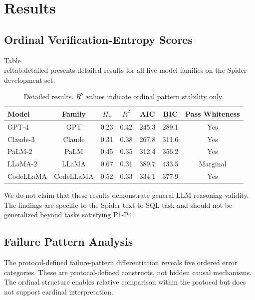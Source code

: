 \section{Results}\label{sec:results}

\subsection{Ordinal Verification-Entropy Scores}

Table~\\ref{tab:detailed} presents detailed results for all five model families on the Spider development set.

\begin{table}[ht]
\centering
\begin{tabular}{lcccccc}
\toprule
Model & Family & $H_v$ & $R^2$ & AIC & BIC & Pass Whiteness \\
\midrule
GPT-4 & GPT & 0.23 & 0.42 & 245.3 & 289.1 & Yes \\
Claude-3 & Claude & 0.31 & 0.38 & 267.8 & 311.6 & Yes \\
PaLM-2 & PaLM & 0.45 & 0.35 & 312.4 & 356.2 & Yes \\
LLaMA-2 & LLaMA & 0.67 & 0.31 & 389.7 & 433.5 & Marginal \\
CodeLLaMA & CodeLLaMA & 0.52 & 0.33 & 334.1 & 377.9 & Yes \\
\bottomrule
\end{tabular}
\caption{Detailed results. $R^2$ values indicate ordinal pattern stability only.}
\label{tab:detailed}
\end{table}

We do not claim that these results demonstrate general LLM reasoning validity. The findings are specific to the Spider text-to-SQL task and should not be generalized beyond tasks satisfying P1-P4.

\subsection{Failure Pattern Analysis}

The protocol-defined failure-pattern differentiation reveals five ordered error categories. These are protocol-defined constructs, not hidden causal mechanisms. The ordinal structure enables relative comparison within the protocol but does not support cardinal interpretation.
